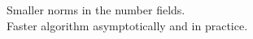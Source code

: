 \documentclass[preview]{standalone}
\begin{document}
Smaller norms in the number fields.\\Faster algorithm asymptotically and in practice. \\
\end{document}
